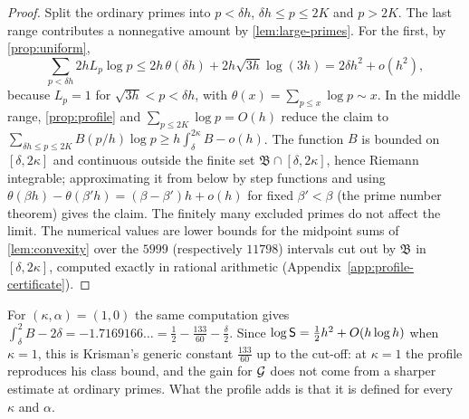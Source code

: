 \begin{proof}
Split the ordinary primes into $p<\delta h$, $\delta h\le p\le2K$ and $p>2K$. The last range
contributes a nonnegative amount by \cref{lem:large-primes}. For the first, by
\cref{prop:uniform},
\[
  \sum_{p<\delta h}2hL_p\log p\le2h\,\theta(\delta h)+2h\sqrt{3h}\log(3h)=2\delta h^2+o(h^2),
\]
because $L_p=1$ for $\sqrt{3h}<p<\delta h$, with $\theta(x)=\sum_{p\le x}\log p\sim x$. In the middle
range, \cref{prop:profile} and $\sum_{p\le2K}\log p=O(h)$ reduce the claim to
$\sum_{\delta h\le p\le2K}B(p/h)\log p\ge h\int_\delta^{2\kappa}B-o(h)$. The function $B$ is bounded
on $[\delta,2\kappa]$ and continuous outside the finite set $\mathfrak B\cap[\delta,2\kappa]$,
hence Riemann integrable; approximating it from below by step functions and using
$\theta(\beta h)-\theta(\beta'h)=(\beta-\beta')h+o(h)$ for fixed $\beta'<\beta$ (the prime number
theorem) gives the claim. The finitely many excluded primes do not affect the limit. The numerical
values are lower bounds for the midpoint sums of \cref{lem:convexity} over the
$5999$ (respectively $11798$) intervals cut out by $\mathfrak B$ in $[\delta,2\kappa]$, computed
exactly in rational arithmetic (Appendix~\ref{app:profile-certificate}).
\end{proof}

\begin{remark}\label{rem:profile-k1}
For $(\kappa,\alpha)=(1,0)$ the same computation gives $\int_\delta^2B-2\delta=-1.7169166\ldots
=\frac12-\frac{133}{60}-\frac\delta2$. Since $\log\mathsf{S}=\frac12h^2+O(h\log h)$ when $\kappa=1$,
this is Krisman's generic constant $\frac{133}{60}$ \cite[Thm.~4.5]{Krisman2026chi2} up to the
cut-off: at $\kappa=1$ the profile reproduces his class bound, and the gain for $\mathcal{G}$ does not
come from a sharper estimate at ordinary primes. What the profile adds is that it is defined for
every $\kappa$ and $\alpha$.
\end{remark}
